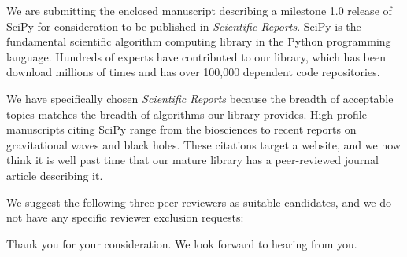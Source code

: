 \documentclass[10pt,stdletter,dateno]{newlfm}
\begin{document}
\begin{newlfm}

We are submitting the enclosed manuscript describing a milestone
1.0 release of SciPy for consideration to be published in
\emph{Scientific Reports}. SciPy is the fundamental scientific 
algorithm computing library in the Python programming language. 
Hundreds of experts have contributed to our library, which
has been download millions of times and has over 100,000 dependent
code repositories.

We have specifically chosen \emph{Scientific Reports} because
the breadth of acceptable topics matches the breadth of algorithms
our library provides. High-profile manuscripts citing SciPy range
from the biosciences to recent reports on gravitational waves and
black holes. These citations target a website, and we now think
it is well past time that our mature library has a peer-reviewed
journal article describing it.

We suggest the following three peer reviewers as suitable candidates,
and we do not have any specific reviewer exclusion requests:

Thank you for your consideration.  We look forward to
hearing from you.

\end{newlfm}
\end{document}
